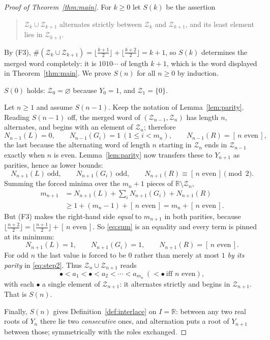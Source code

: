 \documentclass[11pt]{amsart}
\theoremstyle{definition}
\newcommand{\Zs}{\mathcal Z}
\newcommand{\NN}{N}
\begin{document}
\begin{proof}[Proof of Theorem~\ref{thm:main}]
For $k\ge0$ let $S(k)$ be the assertion
\begin{quote}
$\Zs_k\cup\Zs_{k+1}$ alternates strictly between $\Zs_k$ and $\Zs_{k+1}$, and
its least element lies in $\Zs_{k+1}$.
\end{quote}
By (F3), $\#(\Zs_k\cup\Zs_{k+1})=\lfloor\frac{k+1}2\rfloor+\lfloor\frac{k+2}2\rfloor=k+1$,
so $S(k)$ determines the merged word completely: it is $1010\cdots$ of length
$k+1$, which is the word displayed in Theorem~\ref{thm:main}. We prove $S(n)$
for all $n\ge0$ by induction.

$S(0)$ holds: $\Zs_0=\varnothing$ because $Y_0=1$, and $\Zs_1=\{0\}$.

Let $n\ge1$ and assume $S(n-1)$. Keep the notation of
Lemma~\ref{lem:parity}. Reading $S(n-1)$ off, the merged word of
$(\Zs_{n-1},\Zs_n)$ has length $n$, alternates, and begins with an element of
$\Zs_n$; therefore
\begin{equation}\label{eq:step1}
 \NN_{n-1}(L)=0,\qquad
 \NN_{n-1}(G_i)=1\ (1\le i<m_n),\qquad
 \NN_{n-1}(R)=[\,n\text{ even}\,],
\end{equation}
the last because the alternating word of length $n$ starting in $\Zs_n$ ends in
$\Zs_{n-1}$ exactly when $n$ is even. Lemma~\ref{lem:parity} now transfers these
to $Y_{n+1}$ as parities, hence as lower bounds:
\begin{equation}\label{eq:step2}
 \NN_{n+1}(L)\ \text{odd},\qquad
 \NN_{n+1}(G_i)\ \text{odd},\qquad
 \NN_{n+1}(R)\equiv[\,n\text{ even}\,]\pmod2 .
\end{equation}
Summing the forced minima over the $m_n+1$ pieces of $\mathbb R\setminus\Zs_n$,
\begin{equation}\label{eq:sum}
\begin{aligned}
 m_{n+1}
 &=\NN_{n+1}(L)+\sum_{i}\NN_{n+1}(G_i)+\NN_{n+1}(R)\\
 &\ge 1+(m_n-1)+[\,n\text{ even}\,]
 = m_n+[\,n\text{ even}\,].
\end{aligned}
\end{equation}
But (F3) makes the right-hand side \emph{equal} to $m_{n+1}$ in both parities,
because
$\lfloor\frac{n+2}2\rfloor=\lfloor\frac{n+1}2\rfloor+[\,n\text{ even}\,]$.
So \eqref{eq:sum} is an equality and every term is pinned at its minimum:
\[
 \NN_{n+1}(L)=1,\qquad \NN_{n+1}(G_i)=1,\qquad \NN_{n+1}(R)=[\,n\text{ even}\,].
\]
For odd $n$ the last value is forced to be $0$ rather than merely at most $1$
\emph{by its parity} in \eqref{eq:step2}. Thus
$\Zs_n\cup\Zs_{n+1}$ reads
\[
 \bullet<a_1<\bullet<a_2<\cdots<a_{m_n}\ (<\bullet\ \text{iff } n \text{ even}),
\]
with each $\bullet$ a single element of $\Zs_{n+1}$: it alternates strictly and
begins in $\Zs_{n+1}$. That is $S(n)$.

Finally, $S(n)$ gives Definition~\ref{def:interlace} on $I=\mathbb R$: between
any two real roots of $Y_n$ there lie two \emph{consecutive} ones, and
alternation puts a root of $Y_{n+1}$ between those; symmetrically with the roles
exchanged.
\end{proof}
\end{document}
